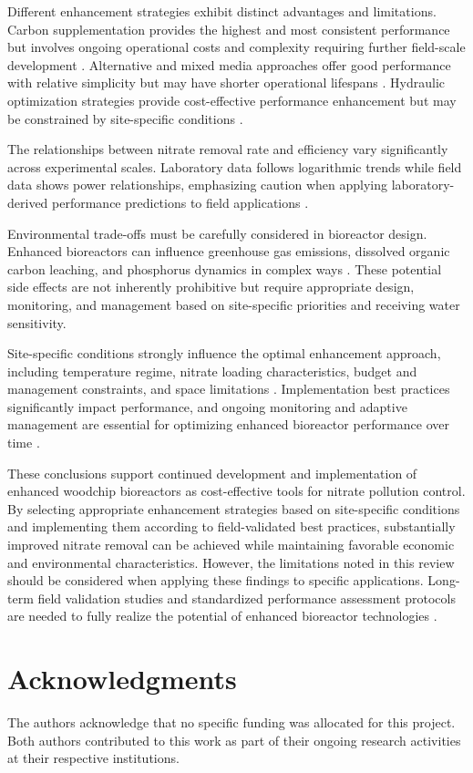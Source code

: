 \documentclass[12pt,a4paper]{article}
\begin{document}
Different enhancement strategies exhibit distinct advantages and limitations. Carbon supplementation provides the highest and most consistent performance but involves ongoing operational costs and complexity requiring further field-scale development \citep{RN632, RN196}. Alternative and mixed media approaches offer good performance with relative simplicity but may have shorter operational lifespans \citep{RN350, RN624}. Hydraulic optimization strategies provide cost-effective performance enhancement but may be constrained by site-specific conditions \citep{RN309}.

The relationships between nitrate removal rate and efficiency vary significantly across experimental scales. Laboratory data follows logarithmic trends while field data shows power relationships, emphasizing caution when applying laboratory-derived performance predictions to field applications \citep{RN312}.

Environmental trade-offs must be carefully considered in bioreactor design. Enhanced bioreactors can influence greenhouse gas emissions, dissolved organic carbon leaching, and phosphorus dynamics in complex ways \citep{RN1181, RN291, RN282}. These potential side effects are not inherently prohibitive but require appropriate design, monitoring, and management based on site-specific priorities and receiving water sensitivity.

Site-specific conditions strongly influence the optimal enhancement approach, including temperature regime, nitrate loading characteristics, budget and management constraints, and space limitations \citep{RN310}. Implementation best practices significantly impact performance, and ongoing monitoring and adaptive management are essential for optimizing enhanced bioreactor performance over time \citep{RN310, RN312}.

These conclusions support continued development and implementation of enhanced woodchip bioreactors as cost-effective tools for nitrate pollution control. By selecting appropriate enhancement strategies based on site-specific conditions and implementing them according to field-validated best practices, substantially improved nitrate removal can be achieved while maintaining favorable economic and environmental characteristics. However, the limitations noted in this review should be considered when applying these findings to specific applications. Long-term field validation studies and standardized performance assessment protocols are needed to fully realize the potential of enhanced bioreactor technologies \citep{RN625, RN310}.

\section{Acknowledgments}

The authors acknowledge that no specific funding was allocated for this project. Both authors contributed to this work as part of their ongoing research activities at their respective institutions.



\end{document}

